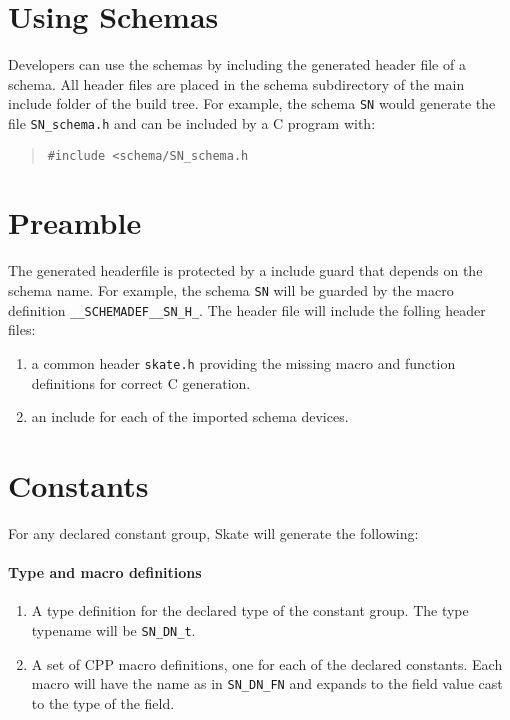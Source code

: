 \documentclass[a4paper,11pt,twoside]{report}
\begin{document}
{{

\section{Using Schemas}

Developers can use the schemas by including the generated header file of a 
schema. All header files are placed in the schema subdirectory of the main 
include folder of the build tree. For example, the 
schema \texttt{SN} would generate the file \texttt{SN\_schema.h} and can 
be included by a C program with:
\begin{quote}
\texttt{\#include <schema/SN\_schema.h}
\end{quote}

\section{Preamble}

The generated headerfile is protected by a include guard that depends on the
schema name. For example, the schema \texttt{SN} will be guarded by the
macro definition \texttt{\_\_SCHEMADEF\_\_SN\_H\_}. The header file will 
include the folling header files:
\begin{enumerate}
  \item a common header \texttt{skate.h} providing the missing macro and 
        function definitions for correct C generation.
  \item an include for each of the imported schema devices.
\end{enumerate}

\section{Constants}

For any declared constant group, Skate will generate the following:

\paragraph{Type and macro definitions}
\begin{enumerate}
  \item A type definition for the declared type of the constant group. The 
        type  typename will be \texttt{SN\_DN\_t}.
  \item A set of CPP macro definitions, one for each of the declared constants.
        Each macro will have the name as in \texttt{SN\_DN\_FN} and expands to the field value cast to the type of the field.
\end{enumerate}

}}
\end{document}
